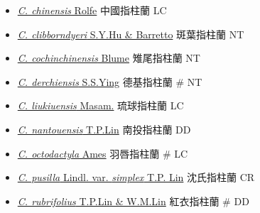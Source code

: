\begin{itemize}
  \begin{itemize}
        \item[] \href{http://www.theplantlist.org/tpl1.1/search?q=Cheirostylis+chinensis}{\textit{C. chinensis} Rolfe}   中國指柱蘭   LC
        \item[] \href{http://www.theplantlist.org/tpl1.1/search?q=Cheirostylis+clibborndyeri}{\textit{C. clibborndyeri} S.Y.Hu \& Barretto}   斑葉指柱蘭   NT
        \item[] \href{http://www.theplantlist.org/tpl1.1/search?q=Cheirostylis+cochinchinensis}{\textit{C. cochinchinensis} Blume}   雉尾指柱蘭   NT
        \item[] \href{http://www.theplantlist.org/tpl1.1/search?q=Cheirostylis+derchiensis}{\textit{C. derchiensis} S.S.Ying}   德基指柱蘭  \# NT
        \item[] \href{http://www.theplantlist.org/tpl1.1/search?q=Cheirostylis+liukiuensis}{\textit{C. liukiuensis} Masam.}   琉球指柱蘭   LC
        \item[] \href{http://www.theplantlist.org/tpl1.1/search?q=Cheirostylis+nantouensis}{\textit{C. nantouensis} T.P.Lin}   南投指柱蘭   DD
        \item[] \href{http://www.theplantlist.org/tpl1.1/search?q=Cheirostylis+octodactyla}{\textit{C. octodactyla} Ames}   羽唇指柱蘭  \# LC
        \item[] \href{http://www.theplantlist.org/tpl1.1/search?q=Cheirostylis+pusilla+var.+simplex}{\textit{C. pusilla} Lindl. var. \textit{simplex} T.P. Lin}   沈氏指柱蘭   CR
        \item[] \href{http://www.theplantlist.org/tpl1.1/search?q=Cheirostylis+rubrifolius}{\textit{C. rubrifolius} T.P.Lin \& W.M.Lin}   紅衣指柱蘭  \# DD

\end{itemize}
\end{itemize}
